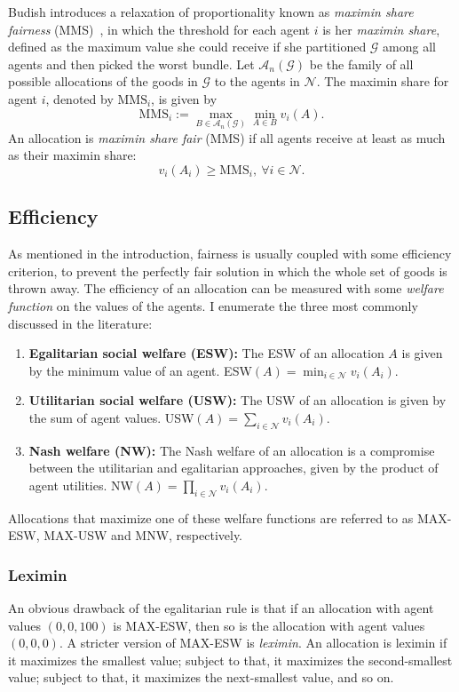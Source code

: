 Budish introduces a relaxation of proportionality known as \textit{maximin share fairness} (MMS)~\cite{Budish2011}, in which the threshold for each agent $i$ is her \textit{maximin share}, defined as the maximum value she could receive if she partitioned $\mathcal{G}$ among all agents and then picked the worst bundle. Let $\mathcal{A}_n(\mathcal{G})$ be the family of all possible allocations of the goods in $\mathcal{G}$ to the agents in $\mathcal{N}$. The maximin share for agent $i$, denoted by $\text{MMS}_i$, is given by
$$\text{MMS}_i := \max_{B\in \mathcal{A}_n(\mathcal{G})} \min_{A \in B} v_i(A).$$
An allocation is \textit{maximin share fair} (MMS) if all agents receive at least as much as their maximin share:
\begin{equation} \tag{MMS}
  v_i(A_i) \geq \text{MMS}_i,\ \forall i \in \mathcal{N}.
\end{equation}

\subsection{Efficiency}
As mentioned in the introduction, fairness is usually coupled with some efficiency criterion, to prevent the perfectly fair solution in which the whole set of goods is thrown away. The efficiency of an allocation can be measured with some \textit{welfare function} on the values of the agents. I enumerate the three most commonly discussed in the literature:
\begin{enumerate}
  \item \textbf{Egalitarian social welfare (ESW):} The ESW of an allocation $A$ is given by the minimum value of an agent. ESW$(A) = \min_{i\in \mathcal{N}}v_i(A_i)$.
  \item \textbf{Utilitarian social welfare (USW):} The USW of an allocation is given by the sum of agent values. USW$(A) = \sum_{i\in \mathcal{N}}v_i(A_i)$.
  \item \textbf{Nash welfare (NW):} The Nash welfare of an allocation is a compromise between the utilitarian and egalitarian approaches, given by the product of agent utilities. NW$(A) = \prod_{i\in \mathcal{N}}v_i(A_i)$.
\end{enumerate}
Allocations that maximize one of these welfare functions are referred to as MAX-ESW, MAX-USW and MNW, respectively. 

\subsubsection*{Leximin}
An obvious drawback of the egalitarian rule is that if an allocation with agent values $(0,0,100)$ is MAX-ESW, then so is the allocation with agent values $(0,0,0)$. A stricter version of MAX-ESW is \textit{leximin}. An allocation is leximin if it maximizes the smallest value; subject to that, it maximizes the second-smallest value; subject to that, it maximizes the next-smallest value, and so on.



